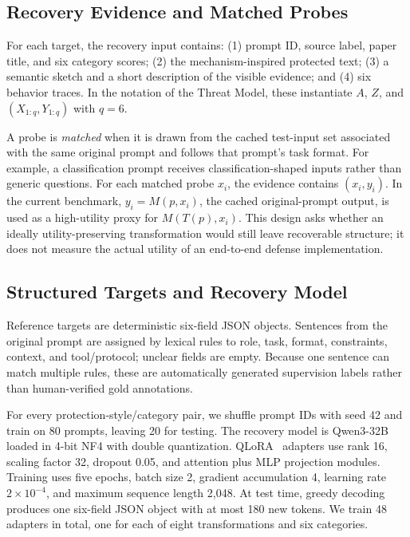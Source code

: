 \documentclass[letterpaper]{article} %
\begin{document}
\subsection{Recovery Evidence and Matched Probes}

For each target, the recovery input contains: (1) prompt ID, source label, paper title, and six category scores; (2) the mechanism-inspired protected text; (3) a semantic sketch and a short description of the visible evidence; and (4) six behavior traces.  In the notation of the Threat Model, these instantiate \(A\), \(Z\), and \((X_{1:q},Y_{1:q})\) with \(q=6\).

A probe is \emph{matched} when it is drawn from the cached test-input set associated with the same original prompt and follows that prompt's task format.  For example, a classification prompt receives classification-shaped inputs rather than generic questions.  For each matched probe \(x_i\), the evidence contains \((x_i,y_i)\).  In the current benchmark, \(y_i=M(p,x_i)\), the cached original-prompt output, is used as a high-utility proxy for \(M(T(p),x_i)\).  This design asks whether an ideally utility-preserving transformation would still leave recoverable structure; it does not measure the actual utility of an end-to-end defense implementation.

\subsection{Structured Targets and Recovery Model}

Reference targets are deterministic six-field JSON objects.  Sentences from the original prompt are assigned by lexical rules to role, task, format, constraints, context, and tool/protocol; unclear fields are empty.  Because one sentence can match multiple rules, these are automatically generated supervision labels rather than human-verified gold annotations.

For every protection-style/category pair, we shuffle prompt IDs with seed 42 and train on 80 prompts, leaving 20 for testing.  The recovery model is Qwen3-32B~\citep{yang2025qwen3} loaded in 4-bit NF4 with double quantization.  QLoRA~\citep{dettmers2023qlora} adapters use rank 16, scaling factor 32, dropout 0.05, and attention plus MLP projection modules.  Training uses five epochs, batch size 2, gradient accumulation 4, learning rate \(2\times10^{-4}\), and maximum sequence length 2,048.  At test time, greedy decoding produces one six-field JSON object with at most 180 new tokens.  We train 48 adapters in total, one for each of eight transformations and six categories.
\end{document}
